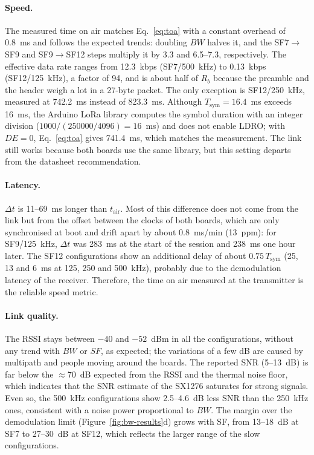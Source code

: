 \documentclass[informe,english]{plantilla}
\begin{document}
\paragraph{Speed.} The measured time on air matches Eq.~\eqref{eq:toa} with a constant overhead of 0.8~ms and follows the expected trends: doubling $BW$ halves it, and the SF7$\to$SF9 and SF9$\to$SF12 steps multiply it by 3.3 and 6.5--7.3, respectively. The effective data rate ranges from 12.3~kbps (SF7/500~kHz) to 0.13~kbps (SF12/125~kHz), a factor of 94, and is about half of $R_b$ because the preamble and the header weigh a lot in a 27-byte packet. The only exception is SF12/250~kHz, measured at 742.2~ms instead of 823.3~ms. Although $T_{\text{sym}} = 16.4$~ms exceeds 16~ms, the Arduino LoRa library computes the symbol duration with an integer division ($1000/(250000/4096) = 16$~ms) and does not enable LDRO; with $DE = 0$, Eq.~\eqref{eq:toa} gives 741.4~ms, which matches the measurement. The link still works because both boards use the same library, but this setting departs from the datasheet recommendation.

\paragraph{Latency.} $\Delta t$ is 11--69~ms longer than $t_{\text{air}}$. Most of this difference does not come from the link but from the offset between the clocks of both boards, which are only synchronised at boot and drift apart by about 0.8~ms/min (13~ppm): for SF9/125~kHz, $\Delta t$ was 283~ms at the start of the session and 238~ms one hour later. The SF12 configurations show an additional delay of about $0.75\,T_{\text{sym}}$ (25, 13 and 6~ms at 125, 250 and 500~kHz), probably due to the demodulation latency of the receiver. Therefore, the time on air measured at the transmitter is the reliable speed metric.

\paragraph{Link quality.} The RSSI stays between $-40$ and $-52$~dBm in all the configurations, without any trend with $BW$ or $SF$, as expected; the variations of a few dB are caused by multipath and people moving around the boards. The reported SNR (5--13~dB) is far below the $\approx 70$~dB expected from the RSSI and the thermal noise floor, which indicates that the SNR estimate of the SX1276 saturates for strong signals. Even so, the 500~kHz configurations show 2.5--4.6~dB less SNR than the 250~kHz ones, consistent with a noise power proportional to $BW$. The margin over the demodulation limit (Figure~\ref{fig:bw-results}d) grows with SF, from 13--18~dB at SF7 to 27--30~dB at SF12, which reflects the larger range of the slow configurations.
\end{document}
